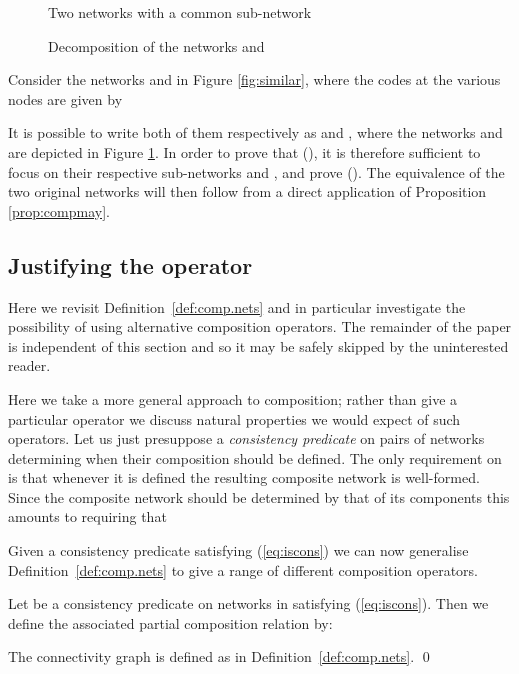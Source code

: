 \documentclass{LMCS}
\begin{document}
\begin{figure}[t]
                                

  \caption{Two networks with a common sub-network\label{fig:similar}}


   \caption{Decomposition of the networks  and \label{fig:decomp}  }
\end{figure}
\begin{exa}
Consider the networks  and  in Figure \ref{fig:similar}, where the codes at the various
nodes are given by

 It is 
possible to write both of them respectively as  and 
, where the networks  and  
are depicted in Figure \ref{fig:decomp}. In order to prove that  (), it is therefore sufficient to focus on their 
respective sub-networks  and ,  and prove
 (). The equivalence of the two 
original networks will  then follow from a direct application 
of Proposition \ref{prop:compmay}.
\end{exa}


\subsection{Justifying the operator }
\label{sec:justify}


Here we revisit Definition~\ref{def:comp.nets} and in particular investigate the possibility
of using alternative composition operators. The remainder of the paper is independent of this
section and so it may be safely skipped by the uninterested reader. 

Here we take a more general approach to composition; rather than give a particular operator we discuss
natural properties we would expect of such operators. Let us just presuppose a \emph{consistency predicate}
 on pairs of networks determining when their composition should be defined. The only requirement
on  is that whenever it is  defined the resulting composite network is well-formed. 
Since the composite network should be  determined by that of its components this amounts to requiring that 


\noindent Given a consistency predicate satisfying (\ref{eq:iscons}) we can now generalise Definition~\ref{def:comp.nets} to 
give a range of different composition operators. 
\begin{defi}\label{def:gen.comp.nets}
  Let  be a consistency  predicate on networks in \nets satisfying 
  (\ref{eq:iscons}). Then we define the associated partial composition
  relation by:

The connectivity graph  is defined as in Definition~\ref{def:comp.nets}.
\qed 
\end{defi}
\end{document}
